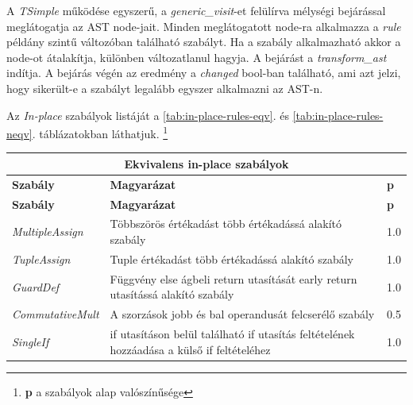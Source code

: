 A \emph{TSimple} működése egyszerű,
a \emph{generic\_visit}-et felülírva mélységi bejárással meglátogatja az AST node-jait.
Minden meglátogatott node-ra alkalmazza
a \emph{rule} példány szintű változóban található szabályt.
Ha a szabály alkalmazható akkor a node-ot átalakítja, különben változatlanul hagyja.
A bejárást a \emph{transform\_ast} indítja.
A bejárás végén az eredmény a \emph{changed} bool-ban található,
ami azt jelzi, hogy sikerült-e a szabályt legalább egyszer alkalmazni az AST-n.

Az \emph{In-place} szabályok listáját a \ref{tab:in-place-rules-eqv}. és \ref{tab:in-place-rules-neqv}.
táblázatokban láthatjuk.
\footnote{\textbf{p} a szabályok alap valószínűsége}

\begin{center}
	\begin{longtable}{ | p{} | p{} | p{} | }
		\hline
		\multicolumn{3}{|c|}{\textbf{Ekvivalens in-place szabályok}}
		\\ \hline
		
		\textbf{Szabály} & \textbf{Magyarázat} & \textbf{p}
		\\ \hline \hline
		\endfirsthead %
		
		\hline
		\textbf{Szabály} & \textbf{Magyarázat} & \textbf{p}
		\\ \hline \hline
		\endhead %
		
		\hline
		\endfoot %
		
		\endlastfoot %
		
		\emph{MultipleAssign}
		& Többszörös értékadást több értékadássá alakító szabály
		& 1.0
		\\ \hline

		\emph{TupleAssign}
		& Tuple értékadást több értékadássá alakító szabály
		& 1.0
		\\ \hline

		\emph{GuardDef}
		& Függvény else ágbeli return utasítását early return utasítássá alakító szabály
		& 1.0
		\\ \hline

		\emph{CommutativeMult}
		& A szorzások jobb és bal operandusát felcserélő szabály
		& 0.5
		\\ \hline

		\emph{SingleIf}
		& if utasításon belül található if utasítás feltételének hozzáadása a külső if feltételéhez
		& 1.0
		\\ \hline
		

\end{longtable}
\end{center}
